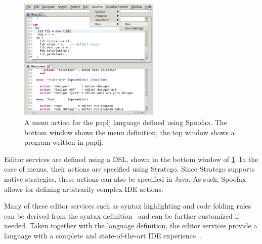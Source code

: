 \begin{figure}[htb]
\centering
\includegraphics[width=0.6\textwidth]{./img/menu-actions.png}
\caption{\label{fig:menu-actions}
A menu action for the paplj language defined using Spoofax. The bottom window shows the menu definition, the top window shows a program written in paplj.}
\end{figure}

Editor services are defined using a DSL, shown in the bottom window of
\cref{fig:menu-actions}. In the case of menus, their actions are
specified using Stratego. Since Stratego supports native strategies,
these actions can also be specified in Java. As such, Spoofax allows
for defining arbitrarily complex IDE actions.

Many of these editor services such as syntax highlighting and code
folding rules can be derived from the syntax
definition~\cite{Kats10c} and can be further customized if
needed. Taken together with the language definition, the editor
services provide a language with a complete and state-of-the-art IDE
experience~\cite{Kats10a}.
